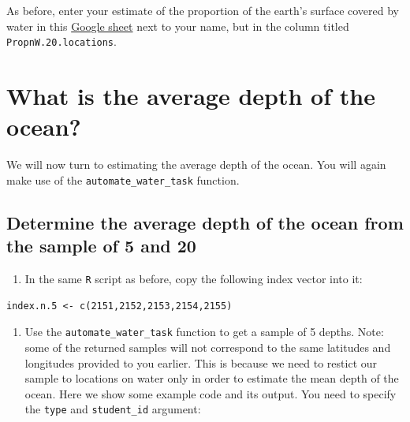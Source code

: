 \documentclass[letterpaper,10pt,twoside,]{pinp}
\providecommand{\tightlist}{%
  \setlength{\itemsep}{0pt}\setlength{\parskip}{0pt}}
\begin{document}
As before, enter your estimate of the proportion of the earth's surface
covered by water in this
\href{https://docs.google.com/spreadsheets/d/1Mnxeq9nQcTdQycZ7S_62fYFiNC5_a3fibsyodzfwO58/edit?usp=sharing}{Google
sheet} next to your name, but in the column titled
\texttt{PropnW.20.locations}.

\hypertarget{what-is-the-average-depth-of-the-ocean}{%
\section{What is the average depth of the
ocean?}\label{what-is-the-average-depth-of-the-ocean}}

We will now turn to estimating the average depth of the ocean. You will
again make use of the \texttt{automate\_water\_task} function.

\hypertarget{determine-the-average-depth-of-the-ocean-from-the-sample-of-5-and-20}{%
\subsection{Determine the average depth of the ocean from the sample of
5 and
20}\label{determine-the-average-depth-of-the-ocean-from-the-sample-of-5-and-20}}

\begin{enumerate}
\def\labelenumi{\arabic{enumi}.}
\tightlist
\item
  In the same \texttt{R} script as before, copy the following index
  vector into it:
\end{enumerate}

\begin{ShadedResult}
\begin{verbatim}
index.n.5 <- c(2151,2152,2153,2154,2155)
\end{verbatim}
\end{ShadedResult}

\begin{enumerate}
\def\labelenumi{\arabic{enumi}.}
\setcounter{enumi}{1}
\tightlist
\item
  Use the \texttt{automate\_water\_task} function to get a sample of 5
  depths. Note: some of the returned samples will not correspond to the
  same latitudes and longitudes provided to you earlier. This is because
  we need to restict our sample to locations on water only in order to
  estimate the mean depth of the ocean. Here we show some example code
  and its output. You need to specify the \texttt{type} and
  \texttt{student\_id} argument:
\end{enumerate}
\end{document}

